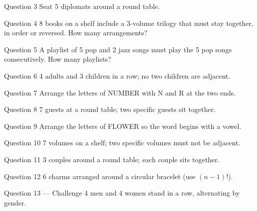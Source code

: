 \documentclass[11pt]{article}
\begin{document}
\begin{qbox}{Question 3}
Seat 5 diplomats around a round table.\workspace{2.4cm}
\end{qbox}

\begin{qbox}{Question 4}
8 books on a shelf include a 3-volume trilogy that must stay together, in order or reversed. How many arrangements?\workspace{2.4cm}
\end{qbox}

\begin{qbox}{Question 5}
A playlist of 5 pop and 2 jazz songs must play the 5 pop songs consecutively. How many playlists?\workspace{2.4cm}
\end{qbox}

\begin{qbox}{Question 6}
4 adults and 3 children in a row; no two children are adjacent.\workspace{2.4cm}
\end{qbox}

\begin{qbox}{Question 7}
Arrange the letters of NUMBER with N and R at the two ends.\workspace{2.4cm}
\end{qbox}

\begin{qbox}{Question 8}
7 guests at a round table; two specific guests sit together.\workspace{2.4cm}
\end{qbox}

\begin{qbox}{Question 9}
Arrange the letters of FLOWER so the word begins with a vowel.\workspace{2.4cm}
\end{qbox}

\begin{qbox}{Question 10}
7 volumes on a shelf; two specific volumes must not be adjacent.\workspace{2.4cm}
\end{qbox}

\begin{qbox}{Question 11}
3 couples around a round table; each couple sits together.\workspace{2.4cm}
\end{qbox}

\begin{qbox}{Question 12}
6 charms arranged around a circular bracelet (use $(n-1)!$).\workspace{2.4cm}
\end{qbox}

\begin{qbox}{Question 13 --- Challenge}
4 men and 4 women stand in a row, alternating by gender.\workspace{3.2cm}
\end{qbox}
\end{document}

